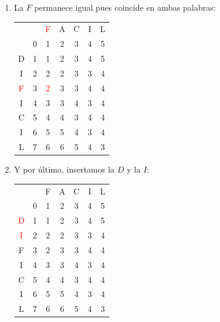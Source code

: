 \documentclass[10pt,a4paper,spanish]{report}
\theoremstyle{definition}
\theoremstyle{remark}
\begin{document}
\begin{enumerate}
\item La $F$ permanece igual pues coincide en ambas palabras:
\begin{center}
\begin{tabular}{c|c|c|c|c|c|c|}
\multicolumn{2}{r}{} & \multicolumn{1}{c}{\textcolor{Red}{F}} & \multicolumn{1}{c}{A} & \multicolumn{1}{c}{C} & \multicolumn{1}{c}{I} & \multicolumn{1}{c}{L} \\ 
\cline{2-7} 
 & 0 & 1 & 2 & 3 & 4 & 5 \\
\cline{2-7}
D & 1 & 1 & 2 & 3 & 4 & 5 \\
\cline{2-7} 
I & \cellcolor{Cyan}2 & 2 & 2 & 3 & 3 & 4 \\
\cline{2-7} 
\textcolor{Red}{F} & 3 & \textcolor{Red}{2} & 3 & 3 & 4 & 4 \\
\cline{2-7} 
I & 4 & 3 & \cellcolor{Green}3 & 4 & 3 & 4 \\
\cline{2-7} 
C & 5 & 4 & 4 & \cellcolor{Green}3 & 4 & 4 \\
\cline{2-7} 
I & 6 & 5 & 5 & 4 & \cellcolor{Green}3 & 4 \\
\cline{2-7} 
L & 7 & 6 & 6 & 5 & 4 & \cellcolor{Green}3 \\
\cline{2-7}  
\end{tabular}
\end{center}

\item Y por último, insertamos la $D$ y la $I$:
\begin{center}
\begin{tabular}{c|c|c|c|c|c|c|}
\multicolumn{2}{r}{} & \multicolumn{1}{c}{F} & \multicolumn{1}{c}{A} & \multicolumn{1}{c}{C} & \multicolumn{1}{c}{I} & \multicolumn{1}{c}{L} \\ 
\cline{2-7} 
 & 0 & 1 & 2 & 3 & 4 & 5 \\
\cline{2-7}
\textcolor{Red}{D} & \cellcolor{Green}1 & 1 & 2 & 3 & 4 & 5 \\
\cline{2-7} 
\textcolor{Red}{I} & \cellcolor{Green}2 & 2 & 2 & 3 & 3 & 4 \\
\cline{2-7} 
F & 3 & \cellcolor{Green}2 & 3 & 3 & 4 & 4 \\
\cline{2-7} 
I & 4 & 3 & \cellcolor{Green}3 & 4 & 3 & 4 \\
\cline{2-7} 
C & 5 & 4 & 4 & \cellcolor{Green}3 & 4 & 4 \\
\cline{2-7} 
I & 6 & 5 & 5 & 4 & \cellcolor{Green}3 & 4 \\
\cline{2-7} 
L & 7 & 6 & 6 & 5 & 4 & \cellcolor{Green}3 \\
\cline{2-7}  
\end{tabular}
\end{center}
\end{enumerate}
\end{document}

